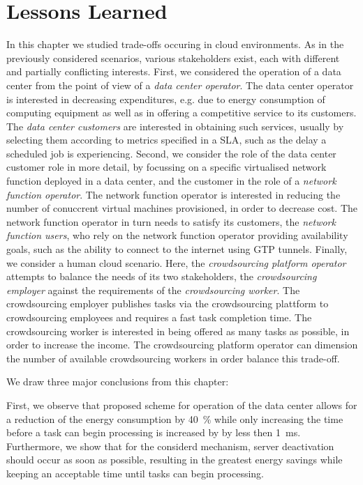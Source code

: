 \section{Lessons Learned}\label{sec:cloud:lessons_learned}
In this chapter we studied trade-offs occuring in cloud environments.
As in the previously considered scenarios, various stakeholders exist, each with different and partially conflicting interests.
First, we considered the operation of a data center from the point of view of a \emph{data center operator}.
The data center operator is interested in decreasing expenditures, e.g. due to energy consumption of computing equipment as well as in offering a competitive service to its customers.
The \emph{data center customers} are interested in obtaining such services, usually by selecting them according to metrics specified in a \gls{SLA}, such as the delay a scheduled job is experiencing.
Second, we consider the role of the data center customer role in more detail, by focussing on a specific virtualised network function deployed in a data center, and the customer in the role of a \emph{network function operator}.
The network function operator is interested in reducing the number of conuccrent virtual machines provisioned, in order to decrease cost.
The network function operator in turn needs to satisfy its customers, the \emph{network function users}, who rely on the network function operator providing availability goals, such as the ability to connect to the internet using \gls{GTP} tunnels.
Finally, we consider a human cloud scenario.
Here, the \emph{crowdsourcing platform operator} attempts to balance the needs of its two stakeholders, the \emph{crowdsourcing employer} against the requirements of the \emph{crowdsourcing worker}.
The crowdsourcing employer publishes tasks via the crowdsourcing plattform to crowdsourcing employees and requires a fast task completion time.
The crowdsourcing worker is interested in being offered as many tasks as possible, in order to increase the income.
The crowdsourcing platform operator can dimension the number of available crowdsourcing workers in order balance this trade-off. 

We draw three major conclusions from this chapter:

First, we observe that proposed scheme for operation of the data center allows for a reduction of the energy consumption by \SI{40}{\percent} while only increasing the time before a task can begin processing is increased by by less then \SI{1}{\milli\second}.
Furthermore, we show that for the considerd mechanism, server deactivation should occur as soon as possible, resulting in the greatest energy savings while keeping an acceptable time until tasks can begin processing. 

